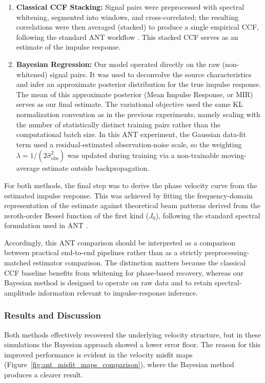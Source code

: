 \documentclass[preprint,1p,times,authoryear]{elsarticle}
\begin{document}
\begin{enumerate}
    \item \textbf{Classical CCF Stacking:} Signal pairs were preprocessed with spectral whitening, segmented into windows, and cross-correlated; the resulting correlations were then averaged (stacked) to produce a single empirical CCF, following the standard ANT workflow \citep{Bensen2007}. This stacked CCF serves as an estimate of the impulse response.

    \item \textbf{Bayesian Regression:} Our model operated directly on the raw (non-whitened) signal pairs. It was used to deconvolve the source characteristics and infer an approximate posterior distribution for the true impulse response. The mean of this approximate posterior (Mean Impulse Response, or MIR) serves as our final estimate. The variational objective used the same KL normalization convention as in the previous experiments, namely scaling with the number of statistically distinct training pairs rather than the computational batch size. In this ANT experiment, the Gaussian data-fit term used a residual-estimated observation-noise scale, so the weighting $\lambda = 1/(2\hat{\sigma}_{\mathrm{obs}}^2)$ was updated during training via a non-trainable moving-average estimate outside backpropagation.
\end{enumerate}

For both methods, the final step was to derive the phase velocity curve from the estimated impulse response. This was achieved by fitting the frequency-domain representation of the estimate against theoretical beam patterns derived from the zeroth-order Bessel function of the first kind ($J_0$), following the standard spectral formulation used in ANT \citep{Aki1957, Ekstrom2009}.

Accordingly, this ANT comparison should be interpreted as a comparison between practical end-to-end pipelines rather than as a strictly preprocessing-matched estimator comparison. The distinction matters because the classical CCF baseline benefits from whitening for phase-based recovery, whereas our Bayesian method is designed to operate on raw data and to retain spectral-amplitude information relevant to impulse-response inference.

\subsubsection{Results and Discussion}
Both methods effectively recovered the underlying velocity structure, but in these simulations the Bayesian approach showed a lower error floor. The reason for this improved performance is evident in the velocity misfit maps (Figure~\ref{fig:ant_misfit_maps_comparison}), where the Bayesian method produces a clearer result.
\end{document}
